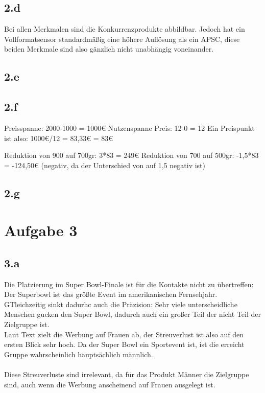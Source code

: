 \subsection{2.d}
    Bei allen Merkmalen sind die Konkurrenzprodukte abbildbar.
    Jedoch hat ein Vollformatsensor standardmäßig eine höhere Auflösung als ein APSC, diese beiden Merkmale sind also gänzlich nicht unabhängig voneinander.

\subsection{2.e}

\subsection{2.f}
    Preisspanne: 2000-1000 = 1000€
    Nutzenspanne Preis: 12-0 = 12
    Ein Preispunkt ist also: 1000€/12 = 83,33€ = 83€

    Reduktion von 900 auf 700gr: 3*83 = 249€
    Reduktion von 700 auf 500gr: -1,5*83 = -124,50€ (negativ, da der Unterschied von auf 1,5 negativ ist)
    

\subsection{2.g}



\section{Aufgabe 3}
\subsection{3.a}
    Die Platzierung im Super Bowl-Finale ist für die Kontakte nicht zu übertreffen: Der Superbowl ist das größte Event im amerikanischen Fernsehjahr. \\
    GTleichzeitig sinkt dadurhc auch die Präzision: Sehr viele unterscheidliche Menschen gucken den Super Bowl, dadurch auch ein großer Teil der nicht Teil der Zielgruppe ist. \\
    Laut Text zielt die Werbung auf Frauen ab, der Streuverlust ist also auf den ersten Blick sehr hoch.
    Da der Super Bowl ein Sportevent ist, ist die erreicht Gruppe wahrscheinlich hauptsächlich männlich. \\
    \ \\
    Diese Streuverluste sind irrelevant, da für das Produkt Männer die Zielgruppe sind, auch wenn die Werbung anscheinend auf Frauen ausgelegt ist. \\

